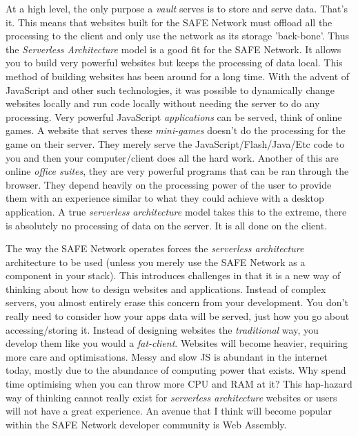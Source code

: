 \documentclass{l4proj}
\begin{document}
At a high level, the only purpose a \textit{vault} serves is to store and serve data. That's it. This means that websites built for the SAFE Network must offload all the processing to the client and only use the network as its storage 'back-bone'. Thus the \textit{Serverless Architecture} model is a good fit for the SAFE Network. It allows you to build very powerful websites but keeps the processing of data local. This method of building websites has been around for a long time. With the advent of JavaScript and other such technologies, it was possible to dynamically change websites locally and run code locally without needing the server to do any processing. Very powerful JavaScript \textit{applications} can be served, think of online games. A website that serves these \textit{mini-games} doesn't do the processing for the game on their server. They merely serve the JavaScript/Flash/Java/Etc code to you and then your computer/client does all the hard work. Another of this are online \textit{office suites}, they are very powerful programs that can be ran through the browser. They depend heavily on the processing power of the user to provide them with an experience similar to what they could achieve with a desktop application. A true \textit{serverless architecture} model takes this to the extreme, there is absolutely no processing of data on the server. It is all done on the client. 

The way the SAFE Network operates forces the \textit{serverless architecture} architecture to be used (unless you merely use the SAFE Network as a component in your stack). This introduces challenges in that it is a new way of thinking about how to design websites and applications. Instead of complex servers, you almost entirely erase this concern from your development. You don't really need to consider how your apps data will be served, just how you go about accessing/storing it. Instead of designing websites the \textit{traditional} way, you develop them like you would a \textit{fat-client}. Websites will become heavier, requiring more care and optimisations. Messy and slow JS is abundant in the internet today, mostly due to the abundance of computing power that exists. Why spend time optimising when you can throw more CPU and RAM at it? This hap-hazard way of thinking cannot really exist for \textit{serverless architecture} websites or users will not have a great experience. An avenue that I think will become popular within the SAFE Network developer community is Web Assembly. 
\end{document}
